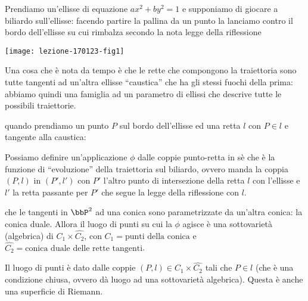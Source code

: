 Prendiamo un'ellisse di equazione $ax^2 + by^2 = 1$ e supponiamo di
giocare a biliardo sull'ellisse: facendo partire la pallina da un punto
la lanciamo contro il bordo dell'ellisse su cui rimbalza secondo la nota
legge della riflessione 

\begin{center}
  \texttt{[image: lezione-170123-fig1]}
\end{center}

Una cosa che è nota da tempo è che le rette che compongono la
traiettoria sono tutte tangenti ad un'altra ellisse ``caustica'' che ha
gli stessi fuochi della prima: abbiamo quindi una famiglia ad un
parametro di ellissi che descrive tutte le possibili traiettorie.

 quando prendiamo un punto $P$
sul bordo dell'ellisse ed una retta $l$ con $P \in l$ e tangente alla
caustica:

Possiamo definire un'applicazione $\phi$ dalle coppie punto-retta in sè
che è la funzione di ``evoluzione'' della traiettoria sul biliardo,
ovvero manda la coppia $(P, l)$ in $(P', l')$ con $P'$ l'altro punto di
intersezione della retta $l$ con l'ellisse e $l'$ la retta passante per
$P'$ che segue la legge della riflessione con $l$.


 che le tangenti in $\bbP^2$ ad una conica sono
parametrizzate da un'altra conica: la conica duale.
Allora il luogo di punti su cui la $\phi$ agisce è una sottovarietà
(algebrica) di $C_1 \times \hat{C_2}$, con $C_1 = \text{punti della
  conica}$ e $\hat{C_2} = \text{conica duale delle rette tangenti}$.

Il luogo di punti è dato dalle coppie $(P, l) \in C_1 \times \hat{C_2}$
tali che $P \in l$ (che è una condizione chiusa, ovvero dà luogo ad una
sottovarietà algebrica). Questa è anche una superficie di Riemann.

